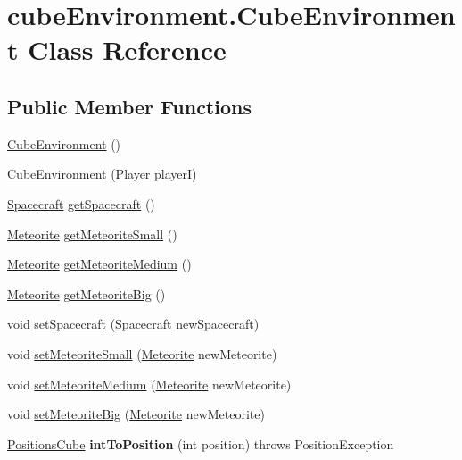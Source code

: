 \hypertarget{classcube_environment_1_1_cube_environment}{}\section{cube\+Environment.\+Cube\+Environment Class Reference}
\label{classcube_environment_1_1_cube_environment}
\subsection*{Public Member Functions}
\begin{DoxyCompactItemize}
\item 
\hyperlink{classcube_environment_1_1_cube_environment_a7aab28baa3136e834671a2b39031a15c}{Cube\+Environment} ()
\item 
\hyperlink{classcube_environment_1_1_cube_environment_a499bd8a94afd3a4038e5d97f73eb1044}{Cube\+Environment} (\hyperlink{classplayer_package_1_1_player}{Player} playerI)
\item 
\hyperlink{classspace_objects_1_1_spacecraft}{Spacecraft} \hyperlink{classcube_environment_1_1_cube_environment_a6d0eb90b0c6cf053139c4ac4ff76e9f0}{get\+Spacecraft} ()
\item 
\hyperlink{classspace_objects_1_1_meteorite}{Meteorite} \hyperlink{classcube_environment_1_1_cube_environment_aeda6bdc32698e0eac05a5dc860a3d944}{get\+Meteorite\+Small} ()
\item 
\hyperlink{classspace_objects_1_1_meteorite}{Meteorite} \hyperlink{classcube_environment_1_1_cube_environment_a7a1a3509cd7fbc80c2dcfad45fa04087}{get\+Meteorite\+Medium} ()
\item 
\hyperlink{classspace_objects_1_1_meteorite}{Meteorite} \hyperlink{classcube_environment_1_1_cube_environment_a2e84a4caf92462f912c3340c162014c6}{get\+Meteorite\+Big} ()
\item 
void \hyperlink{classcube_environment_1_1_cube_environment_a4efde03b2357b31b564ece4c3f66f6d5}{set\+Spacecraft} (\hyperlink{classspace_objects_1_1_spacecraft}{Spacecraft} new\+Spacecraft)
\item 
void \hyperlink{classcube_environment_1_1_cube_environment_ab263bc0754be2dcac50300a753cf0a38}{set\+Meteorite\+Small} (\hyperlink{classspace_objects_1_1_meteorite}{Meteorite} new\+Meteorite)
\item 
void \hyperlink{classcube_environment_1_1_cube_environment_ae6cba09c65695965b9a08eb7e38de758}{set\+Meteorite\+Medium} (\hyperlink{classspace_objects_1_1_meteorite}{Meteorite} new\+Meteorite)
\item 
void \hyperlink{classcube_environment_1_1_cube_environment_af4014fd21f085dd8c2514b56d97f9d4d}{set\+Meteorite\+Big} (\hyperlink{classspace_objects_1_1_meteorite}{Meteorite} new\+Meteorite)
\item 
\hyperlink{enumspace_objects_1_1_positions_cube}{Positions\+Cube} {\bfseries int\+To\+Position} (int position)  throws Position\+Exception \hypertarget{classcube_environment_1_1_cube_environment_ac7f7a9248c1008fcb49e75a173aa9fee}{}\label{classcube_environment_1_1_cube_environment_ac7f7a9248c1008fcb49e75a173aa9fee}


\end{DoxyCompactItemize}
